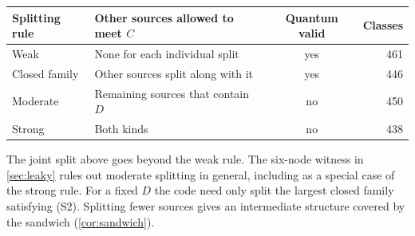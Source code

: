 \begin{center}\small
\begin{tabular}{@{}lp{8cm}cr@{}}
\toprule
Splitting rule & Other sources allowed to meet $C$ & Quantum valid & Classes\\
\midrule
Weak & None for each individual split & yes & 461\\
Closed family & Other sources split along with it & yes & 446\\
Moderate & Remaining sources that contain $D$ & no & 450\\
Strong & Both kinds & no & 438\\
\bottomrule
\end{tabular}
\end{center}
The joint split above goes beyond the weak rule. The six-node witness in \cref{sec:leaky} rules out
moderate splitting in general, including as a special case of the strong rule. For a fixed $D$ the
code need only split the largest closed family satisfying (S2). Splitting fewer sources gives an
intermediate structure covered by the sandwich (\cref{cor:sandwich}).
